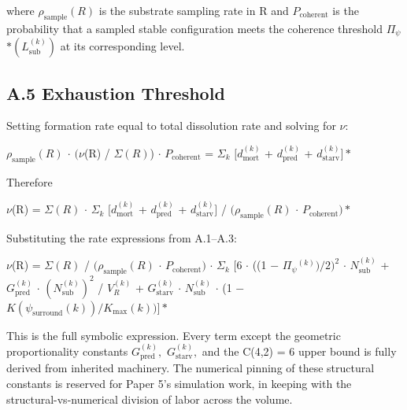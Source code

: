 \documentclass[11pt,oneside]{report}
\theoremstyle{definition}
\theoremstyle{remark}
\begin{document}
where \ensuremath{\rho_{\mathrm{sample}}(R)} is the substrate sampling rate in R and \ensuremath{P_{\mathrm{coherent}}}
is the probability that a sampled stable configuration meets the
coherence threshold \textbar \ensuremath{\Pi_{\psi}}\textbar\ensuremath{*(L_{\mathrm{sub}}^{(k)})} at its
corresponding level.

\subsection*{A.5 Exhaustion Threshold}

Setting formation rate equal to total dissolution rate and solving for
\ensuremath{\nu :}

\emph{\ensuremath{\rho_{\mathrm{sample}}(R)} \ensuremath{\cdot} \ensuremath{(\nu}}(R) / \textbar \ensuremath{\Sigma (R)}\textbar) \ensuremath{\cdot} \ensuremath{P_{\mathrm{coherent}}} =
\ensuremath{\Sigma_{k}} \ensuremath{[d_{\mathrm{mort}}^{(k)}} + \ensuremath{d_{\mathrm{pred}}^{(k)}} + \ensuremath{d_{\mathrm{starv}}^{(k)}]*}

Therefore

\emph{\ensuremath{\nu}}(R) = \textbar \ensuremath{\Sigma (R)}\textbar{} \ensuremath{\cdot} \ensuremath{\Sigma_{k}} \ensuremath{[d_{\mathrm{mort}}^{(k)}} +
\ensuremath{d_{\mathrm{pred}}^{(k)}} + \ensuremath{d_{\mathrm{starv}}^{(k)}]} / \ensuremath{(\rho_{\mathrm{sample}}(R)} \ensuremath{\cdot} \ensuremath{P_{\mathrm{coherent}})*}

Substituting the rate expressions from A.1--A.3:

\emph{\ensuremath{\nu}}(R) = \textbar \ensuremath{\Sigma (R)}\textbar{} / \ensuremath{(\rho_{\mathrm{sample}}(R)} \ensuremath{\cdot} \ensuremath{P_{\mathrm{coherent}})} \ensuremath{\cdot}
\ensuremath{\Sigma_{k}} [6 \ensuremath{\cdot} ((1 \ensuremath{-} \textbar \ensuremath{\Pi_{\psi}}\textbar\ensuremath{^{(k)})/2)^{2}} \ensuremath{\cdot} \ensuremath{N_{\mathrm{sub}}^{(k)}} +
\ensuremath{G_{\mathrm{pred}}^{(k)}} \ensuremath{\cdot} \ensuremath{(N_{\mathrm{sub}}^{(k)})^{2}} / \ensuremath{V_{R}^{(k)}} + \ensuremath{G_{\mathrm{starv}}^{(k)}} \ensuremath{\cdot}
\ensuremath{N_{\mathrm{sub}}^{(k)}} \ensuremath{\cdot} (1 \ensuremath{-} \ensuremath{K(\psi_{\mathrm{surround}}(k))/K_{\mathrm{max}}(k))]*}

This is the full symbolic expression. Every term except the geometric
proportionality constants \ensuremath{G_{\mathrm{pred}}^{(k)},} \ensuremath{G_{\mathrm{starv}}^{(k)},} and the
C(4,2) = 6 upper bound is fully derived from inherited machinery. The
numerical pinning of these structural constants is reserved for Paper
5's simulation work, in keeping with the structural-vs-numerical
division of labor across the volume.
\end{document}
